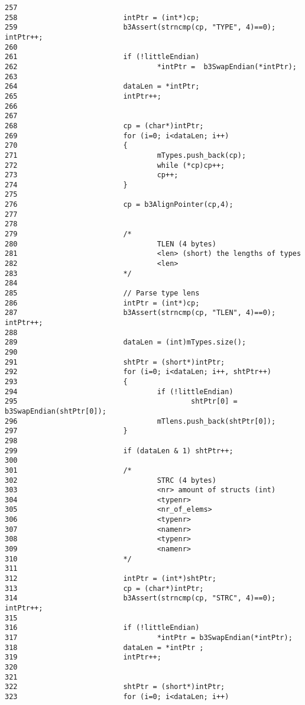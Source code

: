 \begin{Code}
\begin{verbatim}
257 
258                         intPtr = (int*)cp;
259                         b3Assert(strncmp(cp, "TYPE", 4)==0); intPtr++;
260 
261                         if (!littleEndian)
262                                 *intPtr =  b3SwapEndian(*intPtr);
263                         
264                         dataLen = *intPtr;
265                         intPtr++;
266 
267                         
268                         cp = (char*)intPtr;
269                         for (i=0; i<dataLen; i++)
270                         {
271                                 mTypes.push_back(cp);
272                                 while (*cp)cp++;
273                                 cp++;
274                         }
275 
276                         cp = b3AlignPointer(cp,4);
277 
278 
279                         /*
280                                 TLEN (4 bytes)
281                                 <len> (short) the lengths of types
282                                 <len>
283                         */
284 
285                         // Parse type lens
286                         intPtr = (int*)cp;
287                         b3Assert(strncmp(cp, "TLEN", 4)==0); intPtr++;
288 
289                         dataLen = (int)mTypes.size();
290 
291                         shtPtr = (short*)intPtr;
292                         for (i=0; i<dataLen; i++, shtPtr++)
293                         {
294                                 if (!littleEndian)
295                                         shtPtr[0] = b3SwapEndian(shtPtr[0]);
296                                 mTlens.push_back(shtPtr[0]);
297                         }
298 
299                         if (dataLen & 1) shtPtr++;
300 
301                         /*
302                                 STRC (4 bytes)
303                                 <nr> amount of structs (int)
304                                 <typenr>
305                                 <nr_of_elems>
306                                 <typenr>
307                                 <namenr>
308                                 <typenr>
309                                 <namenr>
310                         */
311 
312                         intPtr = (int*)shtPtr;
313                         cp = (char*)intPtr;
314                         b3Assert(strncmp(cp, "STRC", 4)==0); intPtr++;
315 
316                         if (!littleEndian)
317                                 *intPtr = b3SwapEndian(*intPtr);
318                         dataLen = *intPtr ; 
319                         intPtr++;
320 
321 
322                         shtPtr = (short*)intPtr;
323                         for (i=0; i<dataLen; i++)

\end{verbatim}
\end{Code}
